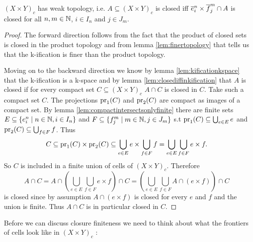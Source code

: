 \begin{lem}\label{lem:weaktopologyproduct}
    $(X \times Y)_c$ has weak topology,
    i.e. $A \subseteq (X \times Y)_c$ is closed iff $\closedCell{n}{i} \times \closedCellf{m}{j} \cap A$ is closed for all $n, m \in \bN$, $i \in I_n$ and $j \in J_m$.
\end{lem}
\begin{proof}
    The forward direction follows from the fact that the product of closed sets is closed in the product topology and from lemma \ref{lem:finertopology} that tells us that the k-ification is finer than the product topology.

    Moving on to the backward direction we know by lemma \ref{lem:kificationkspace} that the k-ification is a k-space and by lemma \ref{lem:closediffinkification} that $A$ is closed if for every compact set $C \subseteq (X \times Y)_c$ $A \cap C$ is closed in $C$.
    Take such a compact set $C$.
    The projections $\pr{1}{C}$ and $\pr{2}{C}$ are compact as images of a compact set. 
    By lemma \ref{lem:compactintersectsonlyfinite} there are finite sets $E \subseteq \{e_i^n \mid n \in \bN, i \in I_n \}$ and $F \subseteq \{f_j^m \mid m \in \bN, j \in J_m \}$ s.t $\pr{1}{C} \subseteq \bigcup_{e \in E} e$ and $\pr{2}{C} \subseteq \bigcup_{f \in F} f$.
    Thus 
    \[C \subseteq \pr{1}{C} \times \pr{2}{C} \subseteq \bigcup_{e \in E} e \times \bigcup_{f \in F} f = \bigcup_{e \in E} \bigcup_{f \in F} e \times f.\] 
    So $C$ is included in a finite union of cells of $(X \times Y)_c$. 
    Therefore 
    \[A \cap C = A \cap \left (\bigcup_{e \in E} \bigcup_{f \in F} e \times f \right )\cap C = \left (\bigcup_{e \in E} \bigcup_{f \in F} A \cap (e \times f)\right ) \cap C\] 
    is closed since by assumption $A \cap (e \times f)$ is closed for every $e$ and $f$ and the union is finite. Thus $A \cap C$ is in particular closed in $C$.
\end{proof}

Before we can discuss closure finiteness we need to think about what the frontiers of cells look like in $(X \times Y)_c$ : 

